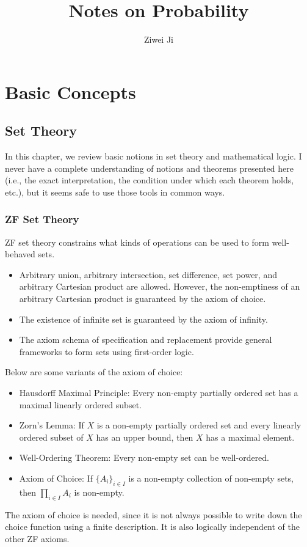 \documentclass[openany]{book}
\author{Ziwei Ji}
\title{Notes on Probability}
\theoremstyle{definition}
\theoremstyle{remark}
\begin{document}
\maketitle
\tableofcontents

\part{Basic Concepts}
\chapter{Set Theory}
In this chapter, we review basic notions in set theory and mathematical logic. I never have a complete understanding of notions and theorems presented here (i.e., the exact interpretation, the condition under which each theorem holds, etc.), but it seems safe to use those tools in common ways.

\section{ZF Set Theory}
ZF set theory constrains what kinds of operations can be used to form well-behaved sets.
\begin{itemize}
    \item Arbitrary union, arbitrary intersection, set difference, set power, and arbitrary Cartesian product are allowed. However, the non-emptiness of an arbitrary Cartesian product is guaranteed by the axiom of choice.
    \item The existence of infinite set is guaranteed by the axiom of infinity.
    \item The axiom schema of specification and replacement provide general frameworks to form sets using first-order logic.
\end{itemize}

Below are some variants of the axiom of choice:
\begin{itemize}
    \item Hausdorff Maximal Principle: Every non-empty partially ordered set has a maximal linearly ordered subset.
    \item Zorn's Lemma: If $X$ is a non-empty partially ordered set and every linearly ordered subset of $X$ has an upper bound, then $X$ has a maximal element.
    \item Well-Ordering Theorem: Every non-empty set can be well-ordered.
    \item Axiom of Choice: If $\{A_i\}_{i\in I}$ is a non-empty collection of non-empty sets, then $\prod_{i\in I}A_i$ is non-empty.
\end{itemize}
The axiom of choice is needed, since it is not always possible to write down the choice function using a finite description. It is also logically independent of the other ZF axioms.
\end{document}
